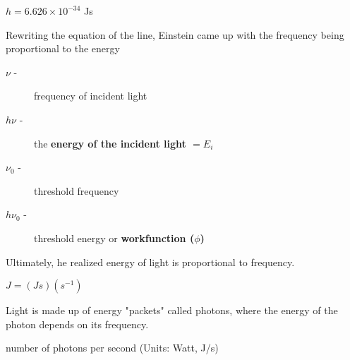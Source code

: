 \begin{constant}
	$h = 6.626 \times 10^{-34}$ Js
\end{constant}

Rewriting the equation of the line, Einstein came up with the frequency being proportional
to the energy


\begin{description}
	\item[$\nu$ -] frequency of incident light
	\item[$h \nu $ -] the \textbf{energy of the incident light $= E_{i}$}
	\item[$\nu _{0}$ -] threshold frequency
	\item[$h\nu_{0}$ -] threshold energy or \textbf{workfunction ($\phi$)}
\end{description}

Ultimately, he realized energy of light is proportional to frequency.

\begin{note}[Units:]
	$J = (Js)(s^{-1})$
\end{note}

Light is made up of energy "packets" called photons, where the energy
of the photon depends on its frequency.


\begin{definition}[Intensity]
	number of photons per second (Units: Watt, J/s)
\end{definition}





\newpage


